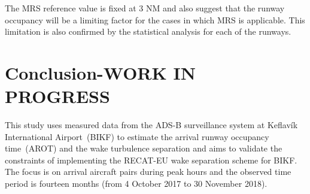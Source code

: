 \begin{table}[]
\centering
{}
\caption[Limiting capacity factors]{Limiting factors for increased airfield capacity. (*) indicates minimum radar separation (MRS).}
\label{tab:limit_capacity}
\end{table}

The MRS reference value is fixed at 3 NM and also suggest that the runway occupancy will be a limiting factor for the cases in which MRS is applicable. This limitation is also confirmed by the statistical analysis for each of the runways.




\chapter{Conclusion-WORK IN PROGRESS\label{cha:conclusions}}

This study uses measured data from the ADS-B surveillance system at Keflavík International Airport~(BIKF) to estimate the arrival runway occupancy time~(AROT) and the wake turbulence separation and aims to validate the constraints of implementing the RECAT-EU wake  separation scheme for BIKF. The focus is on arrival aircraft pairs during peak hours and the observed time period is fourteen months (from 4 October 2017 to 30 November 2018). 

